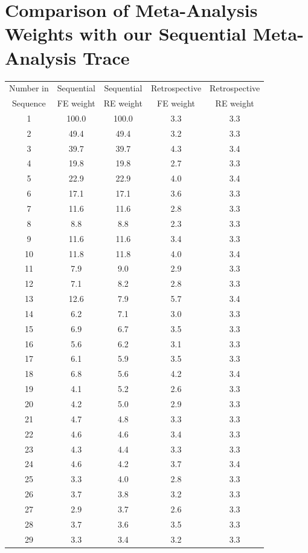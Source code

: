 \section{Comparison of Meta-Analysis Weights with our Sequential Meta-Analysis Trace}
\label{Sec:CompMAW_SMAT}
\begin{table}\renewcommand\thetable{S1} 
\centering
\begin{tabular}[t]{c|cc|cc}
Number in  & Sequential & Sequential  & Retrospective & Retrospective\\
Sequence & FE weight & RE weight & FE weight & RE weight\\
\midrule
1 & 100.0 & 100.0 & 3.3 & 3.3\\
2 & 49.4 & 49.4 & 3.2 & 3.3\\
3 & 39.7 & 39.7 & 4.3 & 3.4\\
4 & 19.8 & 19.8 & 2.7 & 3.3\\
5 & 22.9 & 22.9 & 4.0 & 3.4\\
6 & 17.1 & 17.1 & 3.6 & 3.3\\
7 & 11.6 & 11.6 & 2.8 & 3.3\\
8 & 8.8 & 8.8 & 2.3 & 3.3\\
9 & 11.6 & 11.6 & 3.4 & 3.3\\
10 & 11.8 & 11.8 & 4.0 & 3.4\\
11 & 7.9 & 9.0 & 2.9 & 3.3\\
12 & 7.1 & 8.2 & 2.8 & 3.3\\
13 & 12.6 & 7.9 & 5.7 & 3.4\\
14 & 6.2 & 7.1 & 3.0 & 3.3\\
15 & 6.9 & 6.7 & 3.5 & 3.3\\
16 & 5.6 & 6.2 & 3.1 & 3.3\\
17 & 6.1 & 5.9 & 3.5 & 3.3\\
18 & 6.8 & 5.6 & 4.2 & 3.4\\
19 & 4.1 & 5.2 & 2.6 & 3.3\\
20 & 4.2 & 5.0 & 2.9 & 3.3\\
21 & 4.7 & 4.8 & 3.3 & 3.3\\
22 & 4.6 & 4.6 & 3.4 & 3.3\\
23 & 4.3 & 4.4 & 3.3 & 3.3\\
24 & 4.6 & 4.2 & 3.7 & 3.4\\
25 & 3.3 & 4.0 & 2.8 & 3.3\\
26 & 3.7 & 3.8 & 3.2 & 3.3\\
27 & 2.9 & 3.7 & 2.6 & 3.3\\
28 & 3.7 & 3.6 & 3.5 & 3.3\\
29 & 3.3 & 3.4 & 3.2 & 3.3\\

\end{tabular}
\end{table}
